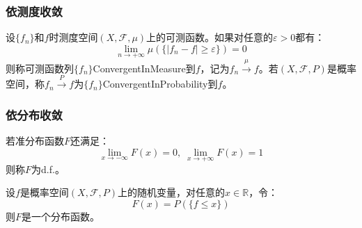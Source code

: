 \subsubsection{依测度收敛}
\begin{definition}
	设$\{f_n\}$和$f$时测度空间$(X,\mathscr{F},\mu)$上的可测函数。如果对任意的$\varepsilon>0$都有：
	\begin{equation*}
		\lim_{n\to+\infty}\mu(\{|f_n-f|\geqslant\varepsilon\})=0
	\end{equation*}
	则称可测函数列$\{f_n\}$\gls{ConvergentInMeasure}到$f$，记为$f_n\overset{\mu}{\longrightarrow}f$。若$(X,\mathscr{F},P)$是概率空间，称$f_n\overset{P}{\longrightarrow}f$为$\{f_n\}$\gls{ConvergentInProbability}到$f$。
\end{definition}
\subsubsection{依分布收敛}
\begin{definition}
	若准分布函数$F$还满足：
	\begin{equation*}
		\lim_{x\to-\infty}F(x)=0,\;\lim_{x\to+\infty}F(x)=1
	\end{equation*}
	则称$F$为\gls{d.f.}。
\end{definition}
\begin{theorem}
	设$f$是概率空间$(X,\mathscr{F},P)$上的随机变量，对任意的$x\in\mathbb{R}$，令：
	\begin{equation*}
		F(x)=P(\{f\leqslant x\})
	\end{equation*}
	则$F$是一个分布函数。
\end{theorem}
